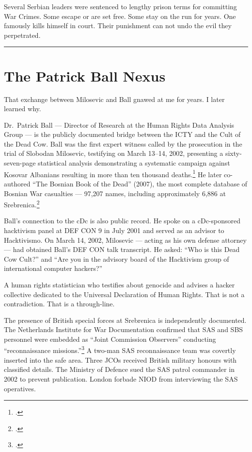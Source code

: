Several Serbian leaders were sentenced to lengthy prison terms for committing War Crimes. Some escape or are set free. Some stay on the run for years. One famously kills himself in court. Their punishment can not undo the evil they perpetrated.

\vspace{1cm}\noindent\rule{0.5\textwidth}{0.5pt}\vspace{0.5cm}

\section*{The Patrick Ball Nexus}
\label{record:hs-patrick-ball-nexus}

That exchange between Milosevic and Ball gnawed at me for years. I later learned why.

Dr.\ Patrick Ball --- Director of Research at the Human Rights Data Analysis Group --- is the publicly documented bridge between the ICTY and the Cult of the Dead Cow. Ball was the first expert witness called by the prosecution in the trial of Slobodan Milosevic, testifying on March 13--14, 2002, presenting a sixty-seven-page statistical analysis demonstrating a systematic campaign against Kosovar Albanians resulting in more than ten thousand deaths.\footcites{ballicty2002}{ictydecision} He later co-authored ``The Bosnian Book of the Dead'' (2007), the most complete database of Bosnian War casualties --- 97,207 names, including approximately 6,886 at Srebrenica.\footcite{foreignpolicy2012}

Ball's connection to the cDc is also public record. He spoke on a cDc-sponsored hacktivism panel at DEF CON 9 in July 2001 and served as an advisor to Hacktivismo. On March 14, 2002, Milosevic --- acting as his own defense attorney --- had obtained Ball's DEF CON talk transcript. He asked: ``Who is this Dead Cow Cult?'' and ``Are you in the advisory board of the Hacktivism group of international computer hackers?''

A human rights statistician who testifies about genocide and advises a hacker collective dedicated to the Universal Declaration of Human Rights. That is not a contradiction. That is a through-line.

The presence of British special forces at Srebrenica is independently documented. The Netherlands Institute for War Documentation confirmed that SAS and SBS personnel were embedded as ``Joint Commission Observers'' conducting ``reconnaissance missions.''\footcite{niod2002} A two-man SAS reconnaissance team was covertly inserted into the safe area. Three JCOs received British military honours with classified details. The Ministry of Defence sued the SAS patrol commander in 2002 to prevent publication. London forbade NIOD from interviewing the SAS operatives.

